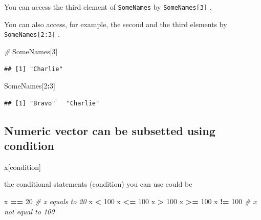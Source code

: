 \documentclass[
]{article}
\newenvironment{Shaded}{\begin{snugshade}}{\end{snugshade}}
\newcommand{\CommentTok}[1]{\textcolor[rgb]{0.56,0.35,0.01}{\textit{#1}}}
\newcommand{\DecValTok}[1]{\textcolor[rgb]{0.00,0.00,0.81}{#1}}
\newcommand{\NormalTok}[1]{#1}
\newcommand{\SpecialCharTok}[1]{\textcolor[rgb]{0.81,0.36,0.00}{\textbf{#1}}}
\begin{document}
You can access the third element of \texttt{SomeNames} by
\texttt{SomeNames{[}3{]}} .

You can also access, for example, the second and the third elements by
\texttt{SomeNames{[}2:3{]}} .

\begin{Shaded}
\begin{Highlighting}[]
\CommentTok{\#}
\NormalTok{SomeNames[}\DecValTok{3}\NormalTok{]}
\end{Highlighting}
\end{Shaded}

\begin{verbatim}
## [1] "Charlie"
\end{verbatim}

\begin{Shaded}
\begin{Highlighting}[]
\NormalTok{SomeNames[}\DecValTok{2}\SpecialCharTok{:}\DecValTok{3}\NormalTok{]}
\end{Highlighting}
\end{Shaded}

\begin{verbatim}
## [1] "Bravo"   "Charlie"
\end{verbatim}

\subsection{Numeric vector can be subsetted using
condition}\label{numeric-vector-can-be-subsetted-using-condition}

\begin{Shaded}
\begin{Highlighting}[]
\NormalTok{                         x[condition]}
\end{Highlighting}
\end{Shaded}

the conditional statements (condition) you can use could be

\begin{Shaded}
\begin{Highlighting}[]
\NormalTok{x }\SpecialCharTok{==} \DecValTok{20}    \CommentTok{\# x equals to 20}
\NormalTok{x }\SpecialCharTok{\textless{}} \DecValTok{100}
\NormalTok{x }\SpecialCharTok{\textless{}=} \DecValTok{100}
\NormalTok{x }\SpecialCharTok{\textgreater{}} \DecValTok{100}
\NormalTok{x }\SpecialCharTok{\textgreater{}=} \DecValTok{100}
\NormalTok{x }\SpecialCharTok{!=} \DecValTok{100}   \CommentTok{\# x not equal to 100}
\end{Highlighting}
\end{Shaded}
\end{document}
